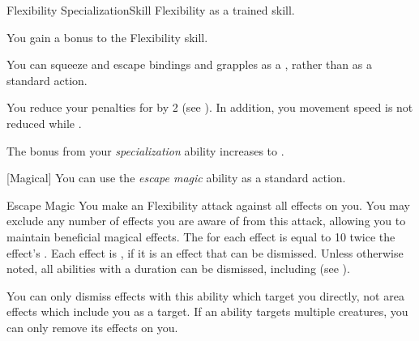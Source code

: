     \begin{feat}{Flexibility Specialization}{Skill}
        \featpre Flexibility as a trained skill.

         You gain a  bonus to the Flexibility skill.

         You can squeeze and escape bindings and grapples as a , rather than as a standard action.

         You reduce your penalties for \squeezing by 2 (see ).
        In addition, you movement speed is not reduced while \squeezing.

         The bonus from your \textit{specialization} ability increases to .

        [Magical] You can use the \textit{escape magic} ability as a standard action.
        \begin{activeability}{Escape Magic}
            \rankline
            You make an Flexibility attack against all  effects on you.
            You may exclude any number of effects you are aware of from this attack, allowing you to maintain beneficial magical effects.
            The  for each effect is equal to 10 \add twice the effect's .
            \hit Each effect is , if it is an effect that can be dismissed.
            Unless otherwise noted, all  abilities with a duration can be dismissed, including  (see ).

            You can only dismiss effects with this ability which target you directly, not area effects which include you as a target.
            If an ability targets multiple creatures, you can only remove its effects on you.
        \end{activeability}
    \end{feat}

